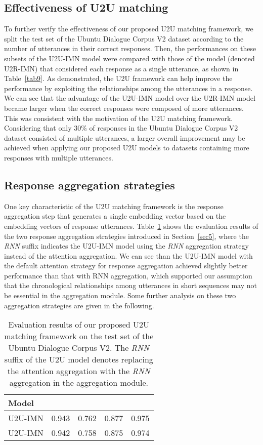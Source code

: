 \documentclass[journal]{IEEEtran}
\begin{document}
 \subsection{Effectiveness of U2U matching} \label{sec7}
    To further verify the effectiveness of our proposed U2U matching framework, we split the test set of the Ubuntu Dialogue Corpus V2 dataset according to the number of utterances in their correct responses.
    Then, the performances on these subsets of the U2U-IMN model were compared with those of the model (denoted U2R-IMN) that considered each response as a single utterance, as shown in Table~\ref{tab9}.
    As demonstrated, the U2U framework can help improve the performance by exploiting the relationships among the utterances in a response.
    We can see that the advantage of the U2U-IMN model over the U2R-IMN model became larger when the correct responses were composed of more utterances.
    This was consistent with the motivation of the U2U matching framework. Considering that only 30\% of responses in the Ubuntu Dialogue Corpus V2 dataset consisted of multiple utterances, a larger overall improvement may be achieved when applying our proposed U2U models to datasets containing more responses with multiple utterances.

  \subsection{Response aggregation strategies} \label{sec6}
    One key characteristic of the U2U matching framework is the response aggregation step that generates a single embedding vector based on the embedding vectors of response utterances.
    Table~\ref{tab5} shows the evaluation results of the two response aggregation strategies introduced in  Section~\ref{sec5}, where the \emph{RNN} suffix indicates the U2U-IMN model using the \emph{RNN} aggregation strategy instead of the attention aggregation.
    We can see than the U2U-IMN model with the default attention strategy for response aggregation achieved slightly better performance than that with RNN aggregation, which supported our assumption that the chronological relationships among utterances in short sequences may not be essential in the aggregation module.
    Some further analysis on these two aggregation strategies are given in the following.

    \begin{table}[t]\small
     \caption{Evaluation results of our proposed U2U matching framework on the test set of the Ubuntu Dialogue Corpus V2. The \emph{RNN} suffix of the U2U model denotes replacing the attention aggregation with the \emph{RNN} aggregation in the aggregation module.}
      \label{tab5}
     \centering
\begin{tabular}{lcccc}
      \toprule
       Model                      &  &  &  & \\
      \midrule
       U2U-IMN                                             & 0.943 & 0.762 & 0.877 & 0.975  \\
       U2U-IMN                              & 0.942 & 0.758 & 0.875 & 0.974  \\
      \bottomrule
      \end{tabular}\end{table}
\end{document}
